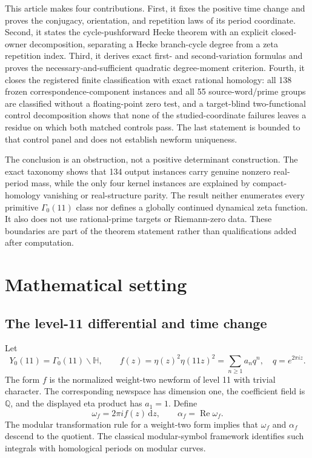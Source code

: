 \documentclass[11pt]{article}
\theoremstyle{definition}
\theoremstyle{remark}
\newcommand{\G}{\Gamma_0(11)}
\newcommand{\HH}{\mathbb H}
\newcommand{\QQ}{\mathbb Q}
\newcommand{\dd}{\,\mathrm d}
\begin{document}
This article makes four contributions. First, it fixes the positive time change and proves the conjugacy, orientation, and repetition laws of its period coordinate. Second, it states the cycle-pushforward Hecke theorem with an explicit closed-owner decomposition, separating a Hecke branch-cycle degree from a zeta repetition index. Third, it derives exact first- and second-variation formulas and proves the necessary-and-sufficient quadratic degree-moment criterion. Fourth, it closes the registered finite classification with exact rational homology: all 138 frozen correspondence-component instances and all 55 source-word/prime groups are classified without a floating-point zero test, and a target-blind two-functional control decomposition shows that none of the studied-coordinate failures leaves a residue on which both matched controls pass. The last statement is bounded to that control panel and does not establish newform uniqueness.

The conclusion is an obstruction, not a positive determinant construction. The exact taxonomy shows that 134 output instances carry genuine nonzero real-period mass, while the only four kernel instances are explained by compact-homology vanishing or real-structure parity. The result neither enumerates every primitive $\G$ class nor defines a globally continued dynamical zeta function. It also does not use rational-prime targets or Riemann-zero data. These boundaries are part of the theorem statement rather than qualifications added after computation.

\section{Mathematical setting}

\subsection{The level-11 differential and time change}

Let
\[
Y_0(11)=\G\backslash\HH,
\qquad
f(z)=\eta(z)^2\eta(11z)^2=\sum_{n\geq1}a_nq^n,
\quad q=e^{2\pi iz}.
\]
The form $f$ is the normalized weight-two newform of level 11 with trivial character. The corresponding newspace has dimension one, the coefficient field is $\QQ$, and the displayed eta product has $a_1=1$.
\citep[Properties and q-expansion]{lmfdb112aa}
Define
\[
\omega_f=2\pi i f(z)\dd z,
\qquad
\alpha_f=\operatorname{Re}\omega_f.
\]
The modular transformation rule for a weight-two form implies that $\omega_f$ and $\alpha_f$ descend to the quotient. The classical modular-symbol framework identifies such integrals with homological periods on modular curves.
\citep[pp.~19--25]{manin1972}
\end{document}
